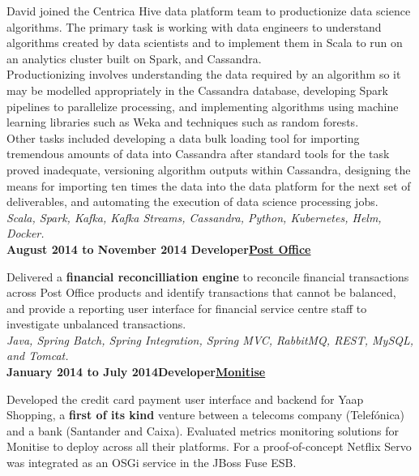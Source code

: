 \documentclass[a4paper,12pt]{article}
\newcommand{\clientwork}[3]{\textbf{#1\hfill#3\hfill#2}\nopagebreak}
\newcommand{\techstack}[1]{\textit{#1}}
\begin{document}
David joined the Centrica Hive data platform team to productionize data science algorithms. The primary task is working with data engineers to understand algorithms created by data scientists and to implement them in Scala to run on an analytics cluster built on Spark, and Cassandra.\\

Productionizing involves understanding the data required by an algorithm so it may be modelled appropriately in the Cassandra database, developing Spark pipelines to parallelize processing, and implementing algorithms using machine learning libraries such as Weka and techniques such as random forests.\\

Other tasks included developing a data bulk loading tool for importing tremendous amounts of data into Cassandra after standard tools for the task proved inadequate, versioning algorithm outputs within Cassandra, designing the means for importing ten times the data into the data platform for the next set of deliverables, and automating the execution of data science processing jobs.\\

\techstack{Scala, Spark, Kafka, Kafka Streams, Cassandra, Python, Kubernetes, Helm, Docker.}\\

\clientwork{August 2014 to November 2014 }{\href{http://www.postoffice.co.uk/}{Post Office}}{Developer}

Delivered a \textbf{financial reconcilliation engine} to reconcile financial transactions across Post Office products and identify transactions that cannot be balanced, and provide a reporting user interface for financial service centre staff to investigate unbalanced transactions.\\

\techstack{Java, Spring Batch, Spring Integration, Spring MVC, RabbitMQ, REST, MySQL, and Tomcat.}\\

\clientwork{January 2014 to July 2014}{\href{http://www.monitise.com/}{Monitise}}{Developer}

Developed the credit card payment user interface and backend for Yaap Shopping, a \textbf{first of its kind} venture between a telecoms company (Telef\'onica) and a bank (Santander and Caixa).  Evaluated metrics monitoring solutions for Monitise to deploy across all their platforms. For a proof-of-concept Netflix Servo was integrated as an OSGi service in the JBoss Fuse ESB.\\
\end{document}
